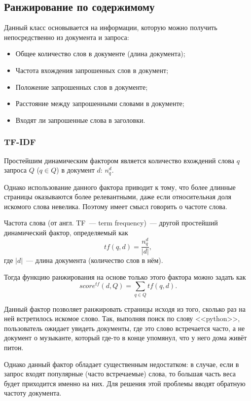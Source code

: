 \subsection{Ранжирование по содержимому}
Данный класс основывается на информации, которую можно получить непосредственно из документа и запроса:
\begin{itemize}
  \item Общее количество слов в документе (длина документа);
  \item Частота вхождения запрошенных слов в документ;
  \item Положение запрошенных слов в документе;
  \item Расстояние между запрошенными словами в документе;
  \item Входят ли запрошенные слова в заголовки.
\end{itemize}


\subsubsection{TF-IDF} \label{sssec:tf-idf}
Простейшим динамическим фактором является количество вхождений слова $q$ запроса $Q$ ($q\in Q$) в документ $d$: $n_q^d$.

Однако использование данного фактора приводит к тому, что более длинные страницы оказываются более релевантными, даже если относительная доля искомого слова невелика. Поэтому имеет смысл говорить о частоте слова.

Частота слова (от англ. TF~--- term frequency)~--- другой простейший динамический фактор, определяемый как
\begin{equation} \label{eq:tf}
  tf(q, d)=\frac{n_q^d}{|d|},
\end{equation}
где $|d|$~--- длина документа (количество слов в нём).

Тогда функцию ранжирования на основе только этого фактора можно задать как
\begin{equation}
  score^{tf}(d, Q) = \sum_{q\in Q} tf(q, d).
\end{equation}

Данный фактор позволяет ранжировать страницы исходя из того, сколько раз на ней встретилось искомое слово. Так, выполняя поиск по слову <<python>>, пользователь ожидает увидеть документы, где это слово встречается часто, а не документ о музыканте, который где-то в конце упомянул, что у него дома живёт питон.

Однако данный фактор обладает существенным недостатком: в случае, если в запрос входят популярные (часто встречаемые) слова, то большая часть веса будет приходится именно на них. Для решения этой проблемы вводят обратную частоту документа.

